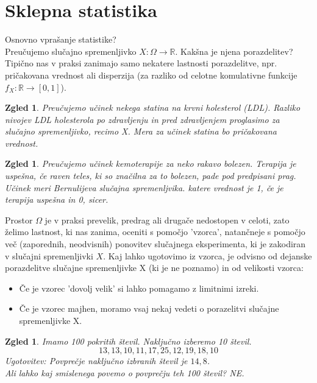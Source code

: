 \documentclass[11pt]{article}
\newtheorem{Zgled}[Izrek]{{\sc Zgled}}
\begin{document}
\section{Sklepna statistika}

Osnovno vprašanje statistike? 
\\
Preučujemo slučajno spremenljivko $X:\Omega \to \mathbb{R}$. Kakšna je njena porazdelitev?
\\
Tipično nas v praksi zanimajo samo nekatere lastnosti porazdelitve, npr. pričakovana vrednost ali disperzija (za razliko od celotne komulativne funkcije $f_X: \mathbb{R}\to [0 ,1] $).

\begin{Zgled}
	Preučujemo učinek nekega statina na krvni holesterol (LDL). Razliko nivojev LDL holesterola po zdravljenju in pred zdravljenjem proglasimo za slučajno spremenljivko, recimo X. Mera za učinek statina bo pričakovana vrednost.
\end{Zgled} 
\begin{Zgled}
	Preučujemo učinek kemoterapije za neko rakavo bolezen. Terapija je uspešna, če raven teles, ki so značilna za to bolezen, pade pod predpisani prag. Učinek meri Bernulijeva slučajna spremenljvika. katere vrednost je 1, če je terapija uspešna in 0, sicer.
\end{Zgled}

Prostor $\Omega$ je v praksi prevelik, predrag ali drugače nedostopen v celoti, zato želimo lastnost, ki nas zanima, oceniti s pomočjo 'vzorca', natančneje s pomočjo več (zaporednih, neodvisnih) ponovitev slučajnega eksperimenta, ki je zakodiran v slučajni spremenljivki $X$. Kaj lahko ugotovimo iz vzorca, je odvisno od dejanske porazdelitve slučajne spremenljivke X (ki je ne poznamo) in od velikosti vzorca:
\begin{itemize}
	\item 
	Če je vzorec 'dovolj velik' si lahko pomagamo z limitnimi izreki.
	\item
	Če je vzorec majhen, moramo vsaj nekaj vedeti o porazelitvi slučajne spremenljivke X.
\end{itemize}
\begin{Zgled}
	Imamo 100 pokritih števil. Naključno izberemo 10 števil. 
	$$ 13, 13, 10, 11, 17, 25, 12, 19, 18, 10$$
	Ugotovitev: Povprečje naključno izbranih števil je $14,8$.
	\\
	Ali lahko kaj smislenega povemo o povprečju teh 100 števil? NE.
\end{Zgled}
\end{document}
